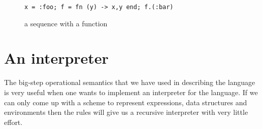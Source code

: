 \documentclass[a4paper,11pt]{article}
\begin{document}
\begin{figure}[ht]
\center
{\tt x = :foo; f = fn (y) -> {x,y} end;  f.(:bar)}
\caption{a sequence with a function}
\label{fig:seq2}
\end{figure}

\section{An interpreter}

The big-step operational semantics that we have used in describing the
language is very useful when one wants to implement an interpreter
for the language. If we can only come up with a scheme to represent
expressions, data structures and environments then the rules will give
us a recursive interpreter with very little effort.
\end{document}

